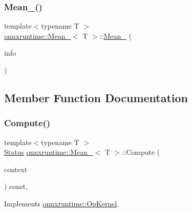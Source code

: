\subsubsection{\texorpdfstring{Mean\+\_()}{Mean\_6()}}
{\footnotesize\ttfamily template$<$typename T $>$ \\
\mbox{\hyperlink{classonnxruntime_1_1Mean__6}{onnxruntime\+::\+Mean\+\_}}$<$ T $>$\+::\mbox{\hyperlink{classonnxruntime_1_1Mean__6}{Mean\+\_}} (\begin{DoxyParamCaption}\item[{const \mbox{\hyperlink{classonnxruntime_1_1OpKernelInfo}{Op\+Kernel\+Info}} \&}]{info }\end{DoxyParamCaption})\hspace{0.3cm}{\ttfamily [inline]}}



\subsection{Member Function Documentation}
\mbox{\label{classonnxruntime_1_1Mean__6_ab7d4eac2311682e6a4390bda625e1afd}} 
\subsubsection{\texorpdfstring{Compute()}{Compute()}\hspace{0.1cm}{\footnotesize\ttfamily [1/2]}}
{\footnotesize\ttfamily template$<$typename T $>$ \\
\mbox{\hyperlink{classonnxruntime_1_1common_1_1Status}{Status}} \mbox{\hyperlink{classonnxruntime_1_1Mean__6}{onnxruntime\+::\+Mean\+\_}}$<$ T $>$\+::Compute (\begin{DoxyParamCaption}\item[{\mbox{\hyperlink{classonnxruntime_1_1OpKernelContext}{Op\+Kernel\+Context}} $\ast$}]{context }\end{DoxyParamCaption}) const\hspace{0.3cm}{\ttfamily [override]}, {\ttfamily [virtual]}}



Implements \mbox{\hyperlink{classonnxruntime_1_1OpKernel_a9eca8656a78b1b3ab9d3351a12798650}{onnxruntime\+::\+Op\+Kernel}}.

\mbox{\label{classonnxruntime_1_1Mean__6_ad86f8f70fa1c945aff65709b0ce162bf}} 
